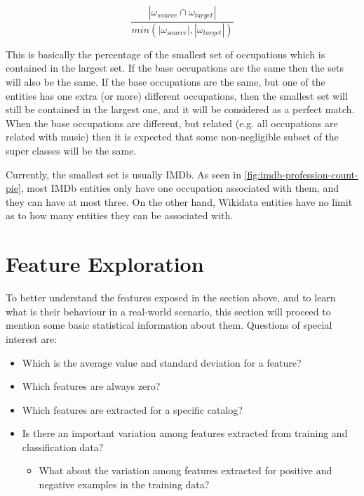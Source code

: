 \documentclass[epsfig,a4paper,11pt,titlepage,twoside,openany]{book}
\begin{document}
\begin{equation*}
    \frac{
        | \omega_{source} \cap \omega_{target} | 
    }{
        min(| \omega_{source} | , | \omega_{target} | )
    }
\end{equation*}

This is basically the percentage of the smallest set of occupations which is contained in the largest set. If the base occupations are the same then the sets will also be the same. If the base occupations are the same, but one of the entities has one extra (or more) different occupations, then the smallest set will still be contained in the largest one, and it will be considered as a perfect match. When the base occupations are different, but related (e.g. all occupations are related with music) then it is expected that some non-negligible subset of the super classes will be the same.

Currently, the smallest set is usually IMDb. As seen in \autoref{fig:imdb-profession-count-pie}, most IMDb entities only have one occupation associated with them, and they can have at most three. On the other hand, Wikidata entities have no limit as to how many entities they can be associated with. 


\section{Feature Exploration}
\label{sec:feature-viz}

To better understand the features exposed in the section above, and to learn what is their behaviour in a real-world scenario, this section will proceed to mention some basic statistical information about them. Questions of special interest are:

\begin{itemize}
    \item Which is the average value and standard deviation for a feature?
    \item Which features are always zero?
    \item Which features are extracted for a specific catalog?
    \item Is there an important variation among features extracted from training and classification data?
    \begin{itemize}
        \item What about the variation among features extracted for positive and negative examples in the training data?
    \end{itemize}
\end{itemize}
\end{document}
